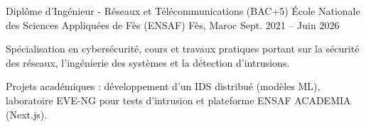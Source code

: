 
\begin{cventries}

    \cventry
    {Diplôme d'Ingénieur - Réseaux et Télécommunications (BAC+5)} %
    {École Nationale des Sciences Appliquées de Fès (ENSAF)} %
    {Fès, Maroc} %
    {Sept. 2021 – Juin 2026} %
    {
        \begin{cvitems}
            \item {Spécialisation en cybersécurité, cours et travaux pratiques portant sur la sécurité des réseaux, l'ingénierie des systèmes et la détection d'intrusions.}
            \item {Projets académiques : développement d'un IDS distribué (modèles ML), laboratoire EVE-NG pour tests d'intrusion et plateforme ENSAF ACADEMIA (Next.js).}
        \end{cvitems}
    }

\end{cventries}